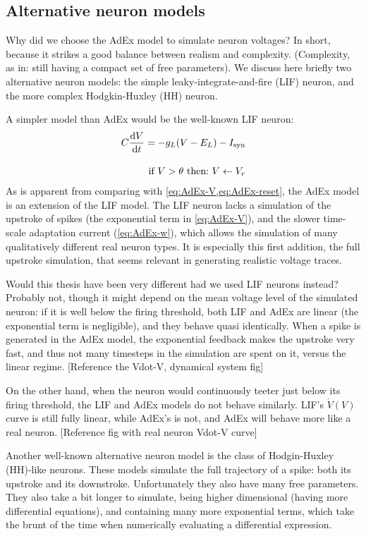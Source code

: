 \subsection{Alternative neuron models}

Why did we choose the AdEx model to simulate neuron voltages? In short, because it strikes a good balance between realism and complexity. (Complexity, as in: still having a compact set of free parameters). We discuss here briefly two alternative neuron models: the simple leaky-integrate-and-fire (LIF) neuron, and the more complex Hodgkin-Huxley (HH) neuron.

A simpler model than AdEx would be the well-known LIF neuron:
\begin{align*}
    C \frac{\mathrm{d}V}{\mathrm{d}t} =  -g_L (V - E_L) - I_{\text{syn}} \\[1em]
    \text{if}\ V > \theta\ \text{then:}\ V \leftarrow V_r \\
\end{align*}
As is apparent from comparing with \cref{eq:AdEx-V,eq:AdEx-reset}, the AdEx model is an extension of the LIF model. The LIF neuron lacks a simulation of the upstroke of spikes (the exponential term in \cref{eq:AdEx-V}), and the slower time-scale adaptation current (\cref{eq:AdEx-w}), which allows the simulation of many qualitatively different real neuron types.
It is especially this first addition, the full upstroke simulation, that seems relevant in generating realistic voltage traces.

Would this thesis have been very different had we used LIF neurons instead?
Probably not, though it might depend on the mean voltage level of the simulated neuron: if it is well below the firing threshold, both LIF and AdEx are linear (the exponential term is negligible), and they behave quasi identically. When a spike is generated in the AdEx model, the exponential feedback makes the upstroke very fast, and thus not many timesteps in the simulation are spent on it, versus the linear regime.
[Reference the Vdot-V, dynamical system fig]

On the other hand, when the neuron would continuously teeter just below its firing threshold, the LIF and AdEx models do not behave similarly. LIF's $\dot{V}(V)$ curve is still fully linear, while AdEx's is not, and AdEx will behave more like a real neuron. [Reference fig with real neuron Vdot-V curve]

Another well-known alternative neuron model is the class of Hodgin-Huxley (HH)-like neurons. These models simulate the full trajectory of a spike: both its upstroke and its downstroke. Unfortunately they also have many free parameters. They also take a bit longer to simulate, being higher dimensional (having more differential equations), and containing many more exponential terms, which take the brunt of the time when numerically evaluating a differential expression.


